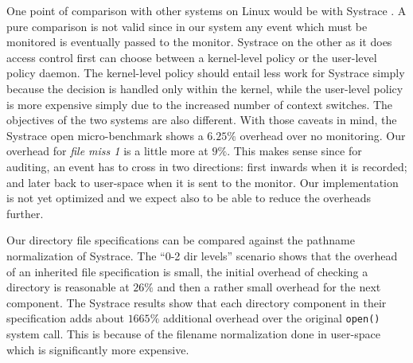 One point of comparison with other systems on Linux would be with
Systrace \cite{provos2003improving}. 
A pure comparison is not valid since in our system any event
which must be monitored is eventually passed to the monitor.
Systrace on the other as it does access control first can choose between a
kernel-level policy or the user-level policy daemon. 
The kernel-level policy should entail less work for Systrace
simply because the decision is handled only within the kernel, while
the user-level policy is more expensive simply due to the increased
number of context switches.
The objectives of the two systems are also different.
With those caveats in mind, the Systrace open micro-benchmark shows a
$6.25\%$ overhead over no monitoring.
Our overhead for {\em file miss 1} is a little more at $9\%$.
This makes sense since for auditing,
an event has to cross in two directions: first inwards when it is recorded; 
and later back to user-space when it is sent to the monitor.
Our implementation is not yet optimized and we expect also to be
able to reduce the overheads further.

Our directory file specifications can be compared against the 
pathname normalization of Systrace.
The ``0-2 dir levels'' scenario shows that the overhead of an inherited
file specification is small, the initial overhead of checking a directory is
reasonable at $26\%$ and then a rather small overhead for the next component.
The Systrace results show that each directory
component in their specification adds about $1665\%$ additional overhead
over the original {\tt open()} system call.
This is because of the filename normalization done in user-space which
is significantly more expensive.

